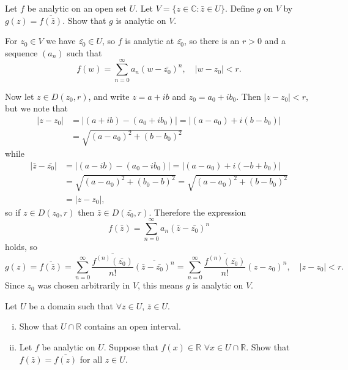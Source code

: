 \documentclass{article}
\newcounter{Problem}
\newenvironment{Problem}{\begin{Exercise}[name={Problem},
                                          counter={Problem}]}
                        {\end{Exercise}}
\begin{document}
\begin{Problem}
  Let $f$ be analytic on an open set $U$. Let
  $V = \{ z \in \mathbb{C} : \bar{z} \in U \}$. Define $g$ on $V$ by
  $g(z) = \overline{f(\bar{z})}$. Show that $g$ is analytic on $V$.
\end{Problem}

\begin{Answer}
For $z_0 \in V$ we have $\bar{z_0} \in U$, so
$f$ is analytic at $\bar{z_0}$, so there is an
$r > 0$ and a sequence $(a_n)$ such that
$$
  f(w)
= \sum_{n=0}^\infty a_n(w - \bar{z_0})^n, \quad
  |w - z_0| < r.
$$

Now let $z \in D(z_0, r)$, and write $z = a + ib$ and
$z_0 = a_0 + ib_0$. Then $|z - z_0| < r$, but we note that
\begin{align*}
  |z - z_0|
&= |(a + ib) - (a_0 + ib_0)|
 = |(a - a_0) + i(b - b_0)| \\
&= \sqrt{(a - a_0)^2 + (b - b_0)^2}
\end{align*}
while
\begin{align*}
  |\bar{z} - \bar{z_0}|
&= |(a - ib) - (a_0 - ib_0)|
 = |(a - a_0) + i(-b + b_0)| \\
&= \sqrt{(a - a_0)^2 + (b_0 - b)^2}
 = \sqrt{(a - a_0)^2 + (b - b_0)^2} \\
&= |z - z_0|,
\end{align*}
so if $z \in D(z_0, r)$ then $\bar{z} \in D(\bar{z_0}, r)$. Therefore
the expression
$$
f(\bar{z})
= \sum_{n=0}^\infty a_n (\bar{z} - \bar{z_0})^n
$$
holds, so
$$
  g(z)
= \overline{f(\bar{z})}
= \sum_{n=0}^\infty \frac{\overline{f^{(n)}(\bar{z_0})}}{n!}
                 \overline{(\bar{z} - \bar{z_0})^n}
= \sum_{n=0}^\infty \frac{\overline{f^{(n)}(\bar{z_0})}}{n!}
                 (z - z_0)^n, \quad
|z - z_0| < r.
$$
Since $z_0$ was chosen arbitrarily
in $V$, this means $g$ is analytic on $V$.
\end{Answer}

\begin{Problem}
  Let $U$ be a domain such that $\forall z \in U$, $\bar{z} \in U$.
  \begin{enumerate}[(i)]
    \item{
      Show that $U \cap \mathbb{R}$ contains an open interval.
    }
    \item{
      Let $f$ be analytic on $U$. Suppose that $f(x) \in \mathbb{R}$
      $\forall x \in U \cap \mathbb{R}$. Show that $f(\bar{z}) = \overline{f(z)}$
      for all $z \in U$.
    }
  \end{enumerate}
\end{Problem}
\end{document}
